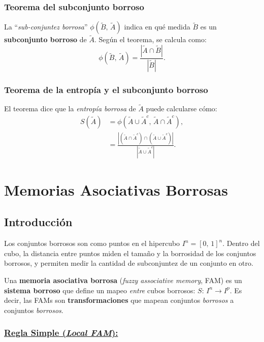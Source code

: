 \documentclass[10pt,a4paper]{article}
\begin{document}
\begin{multicols}{2}

\subsubsection{Teorema del subconjunto borroso}
La ``\textit{sub-conjuntez borrosa}'' $\phi(\tilde{B},\,\tilde{A})$ indica en qué medida $\tilde{B}$ es un \textbf{subconjunto borroso} de $\tilde{A}$. Según el teorema, se calcula como:
\[
\phi(\tilde{B},\,\tilde{A})=\frac{|\tilde{A}\cap \tilde{B}|}{|\tilde{B}|}.
\]

\subsubsection{Teorema de la entropía y el subconjunto borroso}
El teorema dice que la \textit{entropía borrosa} de $\tilde{A}$ puede calcularse cómo:
\begin{align*}
S(\tilde{A}) 
&= \phi(\tilde{A}\cup \tilde{A}^c, \, \tilde{A} \cap \tilde{A}^c), \\
&= \frac{|(\tilde{A} \cap \tilde{A}^c) \cap (\tilde{A}\cup \tilde{A}^c)|}{|\tilde{A}\cup \tilde{A}^c|}.
\end{align*}

\end{multicols}

\section{Memorias Asociativas Borrosas}

\subsection{Introducción}

Los conjuntos borrosos son como puntos en el hipercubo $I^n=[0,\,1]^n$. Dentro del cubo, la distancia entre puntos miden el tamaño y la borrosidad de los conjuntos borrosos, y permiten medir la cantidad de subconjuntez de un conjunto en otro.

Una \textbf{memoria asociativa borrosa} (\textit{fuzzy associative memory}, FAM) es un \textbf{sistema borroso} que define un mapeo \textit{entre} cubos borrosos: $S: \,I^n\rightarrow I^p$. Es decir, las FAMs son \textbf{transformaciones} que mapean conjuntos \textit{borrosos} a conjuntos \textit{borrosos}.

\subsubsection*{\underline{Regla Simple (\textit{Local FAM}):}}
\end{document}
